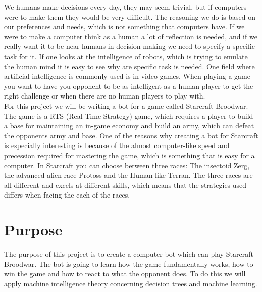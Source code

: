 	We humans make decisions every day, they may seem trivial, but if computers were to make them they would be very difficult. The reasoning we do 
	is based on our preferences and needs, which is not something that computers have. 
	If we were to make a computer think as a human a lot of reflection is needed, and if we really want it to be near humans in decision-making we need 
	to specify a specific task for it. If one looks at the intelligence of robots, which is trying to emulate the human mind 
	it is easy to see why are specific task is needed. One field where artificial intelligence is commonly used is in video games. When playing 
	a game you want to have you opponent to be as intelligent as a human player to get the right challenge or when there are no 
	human players to play with. \\
	
	For this project we will be writing a bot for a game called Starcraft Broodwar. The game is a RTS (Real Time 
	Strategy) game, which requires a player to build a base for maintaining an in-game economy and build an army, 
	which can defeat the opponents army and base. One of the reasons why creating a bot for Starcraft is 
	especially interesting is because of the almost computer-like speed and precession required for mastering the game, 
	which is something that is easy for a computer. 
	In Starcraft you can choose between three races: The insectoid Zerg, the advanced alien race Protoss and the Human-like Terran. 
	The three races are all different and excels at different skills, which means that the strategies used differs when 
	facing the each of the races. 


\section{Purpose}
	The purpose of this project is to create a computer-bot which can play Starcraft Broodwar. 
	The bot is going to learn how the game fundamentally works, 
	how to win the game and how to react to what the opponent does. 
	To do this we will apply machine intelligence theory concerning decision trees and machine learning.


